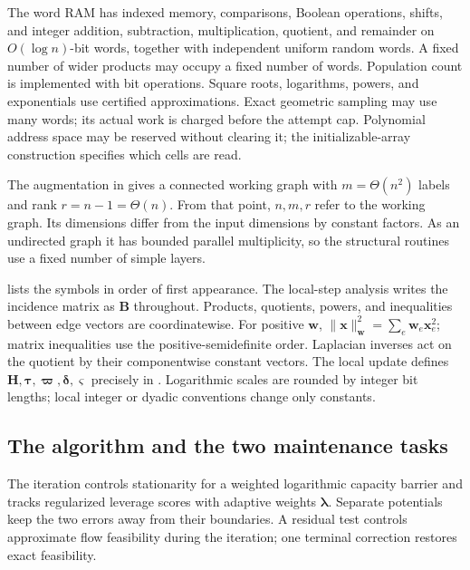 \documentclass[11pt]{article}
\theoremstyle{remark}
\newcommand{\BB}{\mathbf B}
\newcommand{\HH}{\mathbf H}
\newcommand{\llambda}{\boldsymbol{\lambda}}
\newcommand{\ttau}{\boldsymbol{\tau}}
\newcommand{\ww}{\mathbf w}
\newcommand{\vvs}{\boldsymbol{\varsigma}}
\newcommand{\vvp}{\boldsymbol{\varpi}}
\newcommand{\xx}{\mathbf x}
\newcommand{\ddelta}{\boldsymbol{\delta}}
\newcommand{\norm}[1]{\lVert#1\rVert}
\begin{document}
The word RAM has indexed memory, comparisons, Boolean operations, shifts, and
integer addition, subtraction, multiplication, quotient, and remainder on
$O(\log n)$-bit words, together with independent uniform random words.
A fixed number of wider products may occupy a fixed number of words.
Population count is implemented with bit operations.
Square roots, logarithms, powers, and exponentials use certified
approximations.
Exact geometric sampling may use many words; its actual work is charged before
the attempt cap.
Polynomial address space may be reserved without clearing it; the
initializable-array construction specifies which cells are read.

The augmentation in  gives a connected working graph
with $m=\Theta(n^2)$ labels and rank $r=n-1=\Theta(n)$.
From that point, $n,m,r$ refer to the working graph.
Its dimensions differ from the input dimensions by constant factors.
As an undirected graph it has bounded parallel multiplicity, so the structural
routines use a fixed number of simple layers.

 lists the symbols in order of first appearance.
The local-step analysis writes the incidence matrix as $\BB$ throughout.
Products, quotients, powers, and inequalities between edge vectors are
coordinatewise.
For positive $\ww$, $\norm{\xx}_{\ww}^2=\sum_e \ww_e\xx_e^2$; matrix inequalities use the
positive-semidefinite order.
Laplacian inverses act on the quotient by their componentwise constant
vectors.
The local update defines $\HH,\ttau,\vvp,\ddelta,\vvs$ precisely in
.
Logarithmic scales are rounded by integer bit lengths; local integer or dyadic
conventions change only constants.



\subsection{The algorithm and the two maintenance tasks}

The iteration controls stationarity for a weighted logarithmic capacity barrier
and tracks regularized leverage scores with adaptive weights $\llambda$.
Separate potentials keep the two errors away from their boundaries.
A residual test controls approximate flow feasibility during the iteration;
one terminal correction restores exact feasibility.
\end{document}
